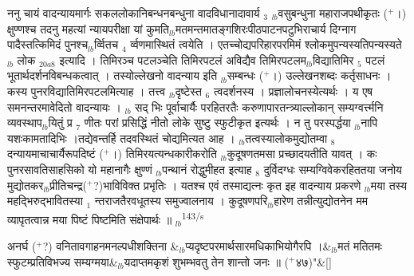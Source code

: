 \documentclass[article,12pt,a4paper]{memoir}%
\newcommand{\add}[1]{($^{+}$#1)}
\newcounter{parCount}
\begin{document}
	  
	  \pstart \leavevmode%
	\hphantom{.}ननु चायं वादन्यायमार्गः सकललोकानिबन्धनबन्धुना {\color{DodgerBlue3}वादविधानादावार्य {\tiny $_{3}$} {\tiny $_{lb}$}वसुबन्धुना} महाराजपथीकृतः \add{।} क्षुण्णश्च तदनु महत्यां {\color{DodgerBlue3}न्यायपरीक्षा} यां कुमति{\tiny $_{lb}$}मतमन्तमातङ्गशिरःपीठपाटनपटुभिराचार्य {\color{DodgerBlue3}दिग्नाग} पादैस्तत्किमिदं पुनश्च{\tiny $_{lb}$}र्व्वितच {\tiny $_{4}$} र्व्वणमास्थितं त्वयेति । एतच्चोद्यपरिहारपरमिमं श्लोकमुपन्यस्यतिपन्यस्यते {\tiny $_{lb}$} {\color{DodgerBlue3}लोक} {\tiny $_{20a8}$} इत्यादि । तिमिरञ्च पटलञ्चेति तिमिरपटलं अविद्यैव तिमिरपटलम{\tiny $_{lb}$}विद्यातिमिर {\tiny $_{5}$} पटलं भूतार्थदर्शनविबन्धकत्वात् । तस्योल्लेखनो वादन्याय इति {\tiny $_{lb}$}सम्बन्धः \add{।} उल्लेखनशब्दः कर्तृसाधनः । कस्य पुनरविद्यातिमिरपटलमित्याह । तत्त्व {\tiny $_{lb}$}दृष्टेस्त {\tiny $_{6}$} त्वदर्शनस्य । प्रज्ञालोचनस्येत्यर्थः । य एष समनन्तरमावेदितो वादन्यायः । {\tiny $_{lb}$} {\color{DodgerBlue3}सद्} भिः पूर्वाचार्यैः परहितरतैः करुणापारतन्त्र्याल्लोकान् सम्यग्वर्त्त्मनि व्यवस्थाप{\tiny $_{lb}$}यितुं प्र {\tiny $_{7}$} णीतः परां प्रसिद्धिं नीतो लोके सुष्टु स्फुटीकृत इत्यर्थः । न तु परस्पर्द्धया {\tiny $_{lb}$}नापि यशःकामतादिभिः ।तद्येवन्तर्हि तदवस्थितं चोद्यमित्यत आह । {\tiny $_{lb}$}तत्वस्यालोकमुद्योतम्वा {\tiny $_{8}$} दन्यायमाचाचार्यैरूपदिष्टं \add{।} तिमिरयत्यन्धकारीकरोति {\tiny $_{lb}$}कुदूषणतमसा प्रच्छादयतीति यावत् । कः पुनरसावतिसाहसिको यो महानागैः क्षुण्णं {\tiny $_{lb}$}पन्थानं रोद्धुमीहत इत्याह {\tiny $_{8}$} \leavevmode{} {\color{DodgerBlue3}दुर्विदग्धः} सम्यग्विवेकरहिततया जनोय {\color{DodgerBlue3}मुद्योतकर{\tiny $_{lb}$}प्रीतिचन्द्र\add{?}भाविविक्त} प्रभृतिः । यतश्च एवं तस्माद्यत्नः कृत इह {\color{DodgerBlue3}वादन्याय} प्रकरणे {\tiny $_{lb}$}मया तस्य महद्भिरुद्भावितस्या {\tiny $_{1}$} न्तराजतैरवधूतस्य समुज्वालनाय । कुदूषणपरि{\tiny $_{lb}$}हारेण तन्नीत्युद्योतनेन मम व्यापृतत्वान्न मया पिष्टं पिष्टमिति संक्षेपार्थः ॥
	{}
	\pend%
      {\tiny $_{lb}$}\textsuperscript{\textenglish{143/s}}
	  \bigskip
	  \begingroup
	
	    
	    \stanza[\smallbreak]
	  अनर्घ \add{?} वनितावगाहनमनल्पधीशक्तिना &{\tiny $_{lb}$}प्यदृष्टपरमार्थसारमधिकाभियोगैरपि ।&{\tiny $_{lb}$}मतं मतितमः स्फुटम्प्रतिविभज्य सम्यग्मया&{\tiny $_{lb}$}यदाप्तमकृशं शुभम्भवतु तेन शान्तो जनः ॥ \add{४७}{\normalfontlatin\large\qquad{}"}\&[\smallbreak]
	  
\end{document}
